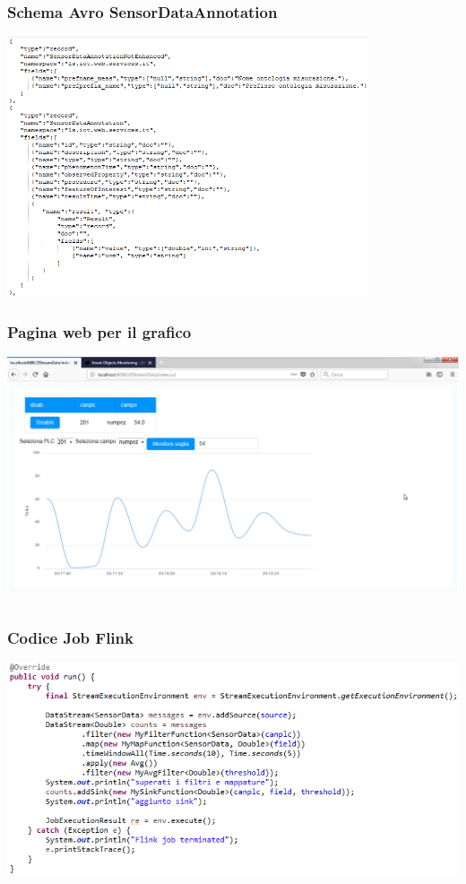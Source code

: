 \documentclass{beamer}
\begin{document}
\begin{frame}
\frametitle{Schema Avro SensorDataAnnotation}
\includegraphics[width=0.8\textwidth]{images/sensordataannotation.png}
\end{frame}

\begin{frame}
\frametitle{Pagina web per il grafico}
\includegraphics[width=1\textwidth]{images/grafico-zk.png}
\end{frame}

\begin{frame}
\frametitle{Codice Job Flink}
\includegraphics[width=1\textwidth]{images/flink-job.png}
\end{frame}
\end{document}
